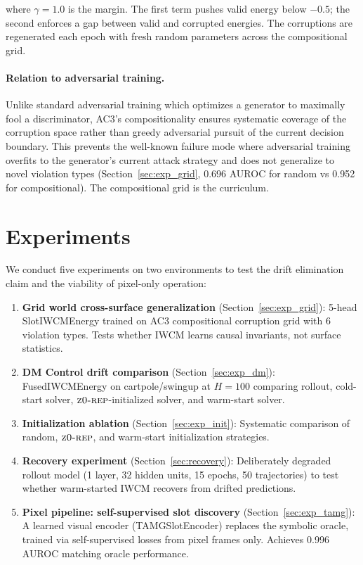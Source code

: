 \documentclass[12pt]{article}
\newcommand{\zrep}{\textsc{z0-rep}}
\begin{document}
where $\gamma = 1.0$ is the margin. The first term pushes valid energy below $-0.5$; the second enforces a gap between valid and corrupted energies. The corruptions are regenerated each epoch with fresh random parameters across the compositional grid.

\paragraph{Relation to adversarial training.} Unlike standard adversarial training which optimizes a generator to maximally fool a discriminator, AC3's compositionality ensures systematic coverage of the corruption space rather than greedy adversarial pursuit of the current decision boundary. This prevents the well-known failure mode where adversarial training overfits to the generator's current attack strategy and does not generalize to novel violation types (Section~\ref{sec:exp_grid}, 0.696 AUROC for random vs 0.952 for compositional). The compositional grid is the curriculum.

\section{Experiments}
\label{sec:experiments}

We conduct five experiments on two environments to test the drift elimination claim and the viability of pixel-only operation:

\begin{enumerate}
  \item \textbf{Grid world cross-surface generalization} (Section~\ref{sec:exp_grid}): 5-head SlotIWCMEnergy trained on AC3 compositional corruption grid with 6 violation types. Tests whether IWCM learns causal invariants, not surface statistics.
  \item \textbf{DM Control drift comparison} (Section~\ref{sec:exp_dm}): FusedIWCMEnergy on cartpole/swingup at $H=100$ comparing rollout, cold-start solver, $\zrep$-initialized solver, and warm-start solver.
  \item \textbf{Initialization ablation} (Section~\ref{sec:exp_init}): Systematic comparison of random, $\zrep$, and warm-start initialization strategies.
  \item \textbf{Recovery experiment} (Section~\ref{sec:recovery}): Deliberately degraded rollout model (1 layer, 32 hidden units, 15 epochs, 50 trajectories) to test whether warm-started IWCM recovers from drifted predictions.
  \item \textbf{Pixel pipeline: self-supervised slot discovery} (Section~\ref{sec:exp_tamg}): A learned visual encoder (TAMGSlotEncoder) replaces the symbolic oracle, trained via self-supervised losses from pixel frames only. Achieves 0.996 AUROC matching oracle performance.
\end{enumerate}
\end{document}
